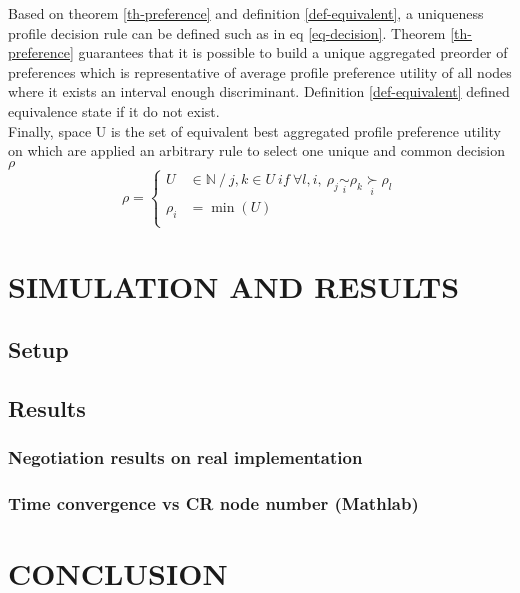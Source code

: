 \documentclass[conference]{IEEEtran}
\newcommand{\preferal}[1]{\underset{#1}{\succ}}
\newcommand{\equivalent}[1]{\underset{#1}{\sim}}
\begin{document}
Based on theorem \ref{th-preference} and definition \ref{def-equivalent}, a uniqueness profile decision rule can be defined such as in eq \ref{eq-decision}. Theorem \ref{th-preference} guarantees that it is possible to build a unique aggregated preorder of preferences which is representative of average profile preference utility of all nodes where it exists an interval enough discriminant. Definition \ref{def-equivalent} defined equivalence state if it do not exist.\\

Finally, space U is the set of equivalent best aggregated profile preference utility on which are applied an arbitrary rule to select one unique and common decision $\rho$
\begin{equation}
\label{eq-decision}
\rho = \left\{
      \begin{aligned}
      U &\in \mathbb{N} \ / \ j,k \in U \ if \ \forall l,i, \ \rho_j \equivalent{i} \rho_k \preferal{i} \rho_l \\
     \rho_i &= \min(U)\\
      \end{aligned}
    \right.
\end{equation}

\section{SIMULATION AND RESULTS}

\subsection{Setup}

\subsection{Results}

\subsubsection{Negotiation results on real implementation}

\subsubsection{Time convergence vs CR node number (Mathlab)}

\section{CONCLUSION}









\end{document}
